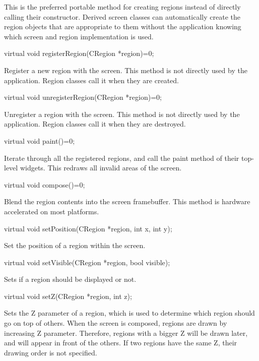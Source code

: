 \documentclass[a4paper,11pt]{journal}
\begin{document}
This is the preferred portable method for creating regions instead of directly calling their constructor. Derived screen classes can automatically create the region objects that are appropriate to them without the application knowing which screen and region implementation is used.\\
\begin{verbatimtab}virtual void registerRegion(CRegion *region)=0;\end{verbatimtab}
Register a new region with the screen. This method is not directly used by the application. Region classes call it when they are created.\\
\begin{verbatimtab}virtual void unregisterRegion(CRegion *region)=0;\end{verbatimtab}
Unregister a region with the screen. This method is not directly used by the application. Region classes call it when they are destroyed.\\
\begin{verbatimtab}virtual void paint()=0;\end{verbatimtab}
Iterate through all the registered regions, and call the paint method of their top-level widgets. This redraws all invalid areas of the screen.\\
\begin{verbatimtab}virtual void compose()=0;\end{verbatimtab}
Blend the region contents into the screen framebuffer. This method is hardware accelerated on most platforms.\\
\begin{verbatimtab}virtual void setPosition(CRegion *region, int x, int y);\end{verbatimtab}
Set the position of a region within the screen.\\
\begin{verbatimtab}virtual void setVisible(CRegion *region, bool visible);\end{verbatimtab}
Sets if a region should be displayed or not.\\
\begin{verbatimtab}virtual void setZ(CRegion *region, int z);\end{verbatimtab}
Sets the Z parameter of a region, which is used to determine which region should go on top of others. When the screen is composed, regions are drawn by increasing Z parameter. Therefore, regions with a bigger Z will be drawn later, and will appear in front of the others. If two regions have the same Z, their drawing order is not specified.\\
\end{document}
